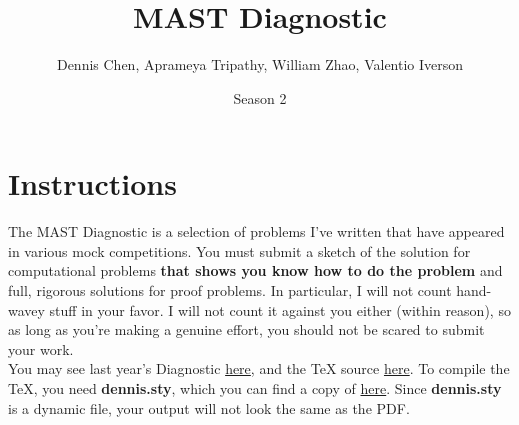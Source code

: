 \documentclass{lucky}
\title{MAST Diagnostic}
\author{Dennis Chen, Aprameya Tripathy, William Zhao, Valentio Iverson}
\date{Season 2}
\begin{document}
\maketitle

\section{Instructions}

The MAST Diagnostic is a selection of problems I've written that have appeared in various mock competitions. You must submit a sketch of the solution for computational problems \textbf{that shows you know how to do the problem} and full, rigorous solutions for proof problems. In particular, I will not count hand-wavey stuff in your favor. I will not count it against you either (within reason), so as long as you're making a genuine effort, you should not be scared to submit your work.
\\[1\baselineskip]
You may see last year's Diagnostic \href{https://www.geometryexplorer.xyz/pdfs/Diagnostic2020.pdf}{here}, and the TeX source \href{https://dl.dropboxusercontent.com/s/vjhnx6rzj4wd8ld/diagnosticquiz2020.tex?dl=0}{here}. To compile the TeX, you need \textbf{dennis.sty}, which you can find a copy of \href{https://raw.githubusercontent.com/chennisden/geometryexplorer/gh-pages/texmf/tex/latex/dennis.sty}{here}. Since \textbf{dennis.sty} is a dynamic file, your output will not look the same as the PDF.
\end{document}
